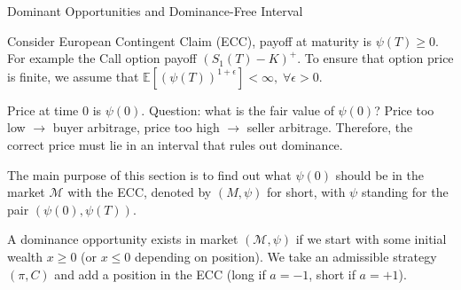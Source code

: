 \documentclass{beamer}
\begin{document}
\begin{frame}{Dominant Opportunities and Dominance-Free Interval}

    {\footnotesize \footnotesize
    \par Consider European Contingent Claim (ECC), payoff at maturity is $\psi(T) \geq 0$. For example the Call option payoff $(S_1(T) - K)^+$.
    To ensure that option price is finite, we assume that  $\mathbb{E}[(\psi(T))^{1+\epsilon}] < \infty, \;\forall \epsilon > 0$.
    \vspace{1em}
    \par  \pause Price at time 0 is $\psi(0)$. Question: what is the fair value of $\psi(0)$?
     Price too low $\rightarrow$ buyer arbitrage, price too high $\rightarrow$ seller arbitrage. 
    Therefore, the correct price must lie in an interval that rules out dominance.
    \vspace{1em}
    \par  \pause The main purpose of this section is to find out what $\psi(0)$ should be in the market $\mathcal{M}$ with the ECC,  
    denoted by $(M, \psi)$ for short, with $\psi$ standing for the pair $(\psi(0), \psi(T))$.
    \vspace{1em}
     \par  \pause A dominance opportunity exists in market $(\mathcal{M}, \psi)$ if  we
     start with some initial wealth $x \geq 0$ (or $x \leq 0$ depending on position). We take an admissible strategy $(\pi, C)$ and 
     add a position in the ECC (long if $a = -1$, short if $a = +1$).
    } 
\end{frame} 
\end{document}
